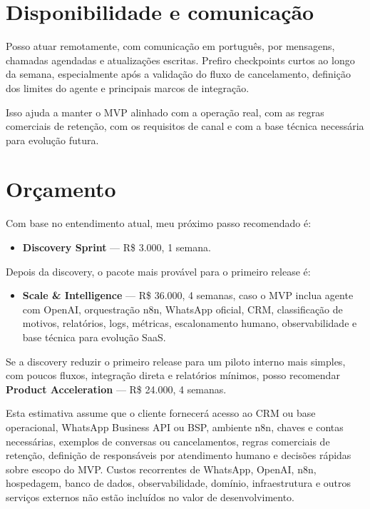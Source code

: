 \documentclass[11pt,a4paper]{article}
\begin{document}
\section*{Disponibilidade e comunicação}

Posso atuar remotamente, com comunicação em português, por mensagens, chamadas agendadas e atualizações escritas. Prefiro checkpoints curtos ao longo da semana, especialmente após a validação do fluxo de cancelamento, definição dos limites do agente e principais marcos de integração.\par

Isso ajuda a manter o MVP alinhado com a operação real, com as regras comerciais de retenção, com os requisitos de canal e com a base técnica necessária para evolução futura.\par

\section*{Orçamento}

Com base no entendimento atual, meu próximo passo recomendado é:\par

\begin{itemize}
\item \textbf{Discovery Sprint} --- R\$ 3.000, 1 semana.
\end{itemize}

Depois da discovery, o pacote mais provável para o primeiro release é:\par

\begin{itemize}
\item \textbf{Scale \& Intelligence} --- R\$ 36.000, 4 semanas, caso o MVP inclua agente com OpenAI, orquestração n8n, WhatsApp oficial, CRM, classificação de motivos, relatórios, logs, métricas, escalonamento humano, observabilidade e base técnica para evolução SaaS.
\end{itemize}

Se a discovery reduzir o primeiro release para um piloto interno mais simples, com poucos fluxos, integração direta e relatórios mínimos, posso recomendar \textbf{Product Acceleration} --- R\$ 24.000, 4 semanas.\par

Esta estimativa assume que o cliente fornecerá acesso ao CRM ou base operacional, WhatsApp Business API ou BSP, ambiente n8n, chaves e contas necessárias, exemplos de conversas ou cancelamentos, regras comerciais de retenção, definição de responsáveis por atendimento humano e decisões rápidas sobre escopo do MVP. Custos recorrentes de WhatsApp, OpenAI, n8n, hospedagem, banco de dados, observabilidade, domínio, infraestrutura e outros serviços externos não estão incluídos no valor de desenvolvimento.\par
\end{document}
